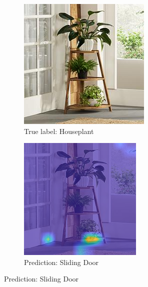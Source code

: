 \begin{figure}
     \vspace{0.5em}
     \begin{subfigure}[b]{0.30\textwidth}
         \centering
         \includegraphics[width=\textwidth]{images/house-plant.jpeg}
         \caption{True label: Houseplant}
         \label{fig:layer-5}
     \end{subfigure}
     \hspace{1em}%
     \begin{subfigure}[b]{0.30\textwidth}
         \centering
         \includegraphics[width=\textwidth]{images/sliding-door-hm.png}
         \caption{Prediction: Sliding Door}
         \label{fig:layer-9}
     \end{subfigure}
     

\end{figure}
